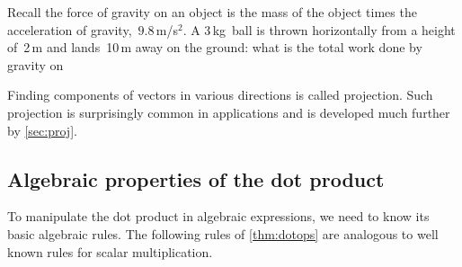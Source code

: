 \begin{activity}
Recall the force of gravity on an object is the mass of the object times the acceleration of gravity,~\(9.8\)\,m/s\({}^2\).
A 3\,kg~ball is thrown horizontally from a height of~2\,m and lands~10\,m away on the ground: what is the total work done by gravity on 
\end{activity}


Finding components of vectors in various directions is called projection. 
Such projection is surprisingly common in applications and is developed much further by \cref{sec:proj}.









\subsection{Algebraic properties of the dot product}
\label{sec:apdp}


To manipulate the dot product in algebraic expressions, we need to know its basic algebraic rules.
The following rules of \cref{thm:dotops} are analogous to well known rules for scalar multiplication.



